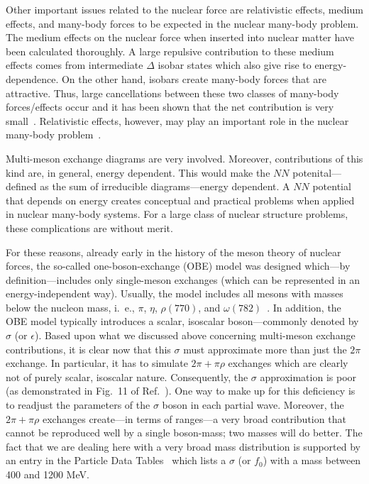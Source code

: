 Other important issues related to the nuclear force are
relativistic effects, medium effects, and many-body forces to be expected in 
the nuclear many-body problem. 
The medium effects on the nuclear force when inserted into nuclear matter have 
been calculated thoroughly. 
A large repulsive contribution to these medium effects comes from
intermediate $\Delta$ isobar states
which also give
rise to energy-dependence. 
On the other hand, isobars 
create many-body forces that are attractive. Thus, large 
cancellations between these two classes of many-body forces/effects occur
and it has been shown that
the net contribution is very small~\cite{Mac99a}.
Relativistic effects, however, may play an important role
in the nuclear many-body problem~\cite{Mac89}.

Multi-meson exchange diagrams are very involved.
Moreover, contributions of this kind are, in general,
energy dependent. This would make the $NN$ potenital---defined
as the sum of irreducible diagrams---energy dependent.
A $NN$ potential that depends on energy creates conceptual and practical
problems when applied in nuclear many-body systems.
For a large class of nuclear structure problems, these complications
are without merit.

For these reasons, already early in the history of the meson theory
of nuclear forces, the so-called one-boson-exchange (OBE) model
was designed which---by definition---includes only single-meson exchanges
(which can be represented in an energy-independent way). 
Usually, the model includes all mesons with masses below the nucleon mass,
i.~e., $\pi$, $\eta$, 
$\rho(770)$, and $\omega(782)$~\cite{PDG98}.
In addition, the OBE model typically introduces a scalar, isoscalar
boson---commonly denoted by $\sigma$ (or $\epsilon$).
Based upon what we discussed above concerning multi-meson
exchange contributions, it is clear now that this $\sigma$
must approximate more than just the $2\pi$ exchange.
In particular, it has to simulate $2\pi+\pi\rho$ exchanges
which are clearly not of purely scalar, isoscalar nature.
Consequently, the $\sigma$ approximation is poor
(as demonstrated in Fig.~11 of Ref.~\cite{MHE87}).
One way to make up for this deficiency is to readjust
the parameters of the $\sigma$ boson in each partial wave.
Moreover, the $2\pi+\pi\rho$ exchanges create---in terms of
ranges---a very broad contribution that cannot be reproduced well
by a single boson-mass; two masses will do better.
The fact that we are dealing here with a very broad mass distribution
is supported
by an entry in the Particle Data Tables~\cite{PDG98} which lists a
$\sigma$ (or $f_0$) with a mass between 400 and 1200 MeV.

